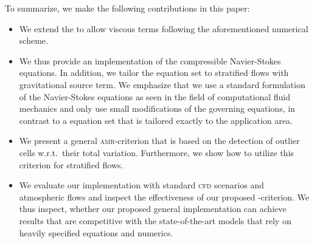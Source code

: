 \documentclass[runningheads]{llncs}
\begin{document}
To summarize, we make the following contributions in this paper:%
\begin{itemize}%
\item We extend the \exahypeengine{} to allow viscous terms following the aforementioned numerical scheme.
\item We thus provide an implementation of the compressible Navier-Stokes equations.
  In addition, we tailor the equation set to stratified flows with gravitational source term.
  We emphasize that we use a standard formulation of the Navier-Stokes equations as seen in the field of computational fluid mechanics and only use small modifications of the governing equations, in contrast to a equation set that is tailored exactly to the application area.
\item We present a general \textsc{amr}-criterion that is based on the detection of outlier cells w.r.t.\ their total variation.
  Furthermore, we show how to utilize this criterion for stratified flows.
\item We evaluate our implementation with standard \textsc{cfd} scenarios and atmospheric flows and inspect the effectiveness of our proposed \amr{}-criterion.
  We thus inspect, whether our proposed general implementation can achieve results that are competitive with the state-of-the-art models that rely on heavily specified equations and numerics.
\end{itemize}
%
\end{document}
